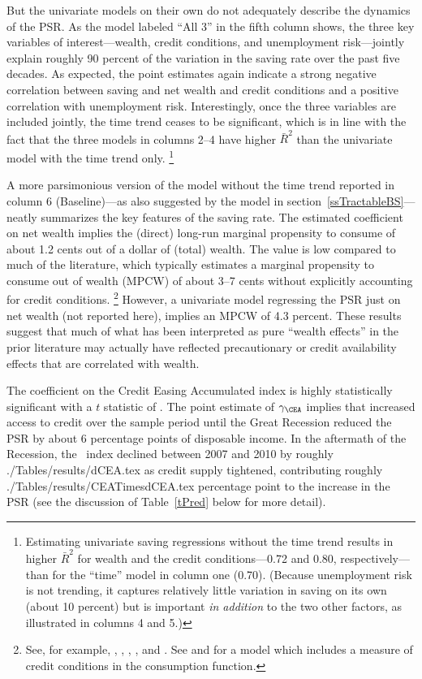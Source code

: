 \documentclass[titlepage]{\econtex}
\begin{document}
 But the univariate models on their own do not adequately describe the
 dynamics of the PSR. As the model labeled ``All 3'' in the fifth column shows, the
 three key variables of interest---wealth, credit
 conditions, and unemployment risk---jointly explain roughly 90 percent of the variation in
 the saving rate over the past five decades. As expected, the point
 estimates again indicate a strong negative correlation between saving
 and net wealth and credit conditions and a positive correlation with
 unemployment risk. Interestingly, once the three variables are
 included jointly, the time trend ceases to be significant, which is
 in line with the fact that the three models in columns 2--4 have
 higher $\bar{R}^2$ than the univariate model with the time trend
 only.%
 \footnote{   Estimating univariate saving regressions without the time trend
   results in higher $\bar{R}^2$ for wealth and the credit
   conditions---0.72 and 0.80, respectively---than for the ``time''
   model in column one (0.70). (Because unemployment risk is not
   trending, it captures relatively little variation in saving on its
   own (about 10 percent) but is important \emph{in addition} to the
   two other factors, as illustrated in columns 4 and 5.)  }

 A more parsimonious version of the model without the time trend reported in column
 6 (Baseline)---as also suggested by the model in
 section~\ref{ssTractableBS}---neatly summarizes the key features of
 the saving rate.  The estimated coefficient on net wealth implies the
 (direct) long-run marginal propensity to consume of about 1.2 cents out
 of a dollar of (total) wealth. The value is low compared
 to much of the literature, which typically estimates a marginal
 propensity to consume out of wealth (MPCW) of about 3--7 cents
 without explicitly accounting for credit conditions.%
 \footnote{   See, for example, \cite{skinner96_sideshow},
   \cite{ludvigsonSteindel_99}, \cite{llTrendCycle}, \cite{cqs05}, and
   \cite{cos11}. See \citet{mue07} and \cite{ducaEtAl10_creditArch}
   for a model which includes a measure of credit conditions in the
   consumption function.  } However, a univariate model regressing
 the PSR just on net wealth (not reported here), implies an MPCW of
 4.3 percent.  These results suggest that much of what has been interpreted as pure ``wealth effects'' in the prior literature may actually have reflected precautionary or credit availability effects that are correlated with wealth.

The coefficient on the Credit Easing Accumulated index is highly
statistically significant with a $t$ statistic
of
. The point estimate of $\gamma _{\CEA}$ implies that increased
access to credit over the sample period until the Great Recession
reduced the PSR by about 6 percentage points of disposable income. In
the aftermath of the Recession, the \CEA\ index declined between 2007 and
2010 by roughly ./Tables/results/dCEA.tex
as credit supply tightened, contributing roughly ./Tables/results/CEATimesdCEA.tex
 percentage point to the increase in the PSR (see the discussion of Table~\ref{tPred} below for more detail).
\end{document}
